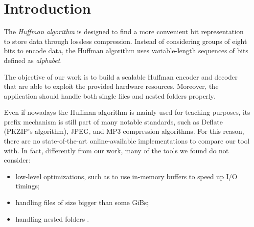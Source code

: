 \section{Introduction}
The \emph{Huffman algorithm} is designed to find a more convenient bit representation to store data through lossless compression. Instead of considering groups of eight bits to encode data, the Huffman algorithm uses variable-length sequences of bits defined as \emph{alphabet}.

The objective of our work is to build a scalable Huffman encoder and decoder that are able to exploit the provided hardware resources. Moreover, the application should handle both single files and nested folders properly.

Even if nowadays the Huffman algorithm is mainly used for teaching purposes, its prefix mechanism is still part of many notable standards, such as Deflate (PKZIP's algorithm), JPEG, and MP3 compression algorithms. For this reason, there are no state-of-the-art online-available implementations to compare our tool with. In fact, differently from our work, many of the tools we found do not consider:
\begin{itemize}
    \item low-level optimizations, such as to use in-memory buffers to speed up I/O timings\cite{HuffmanParallel,ParallelizedTextCompressio,HuffmanParallel2,Huffman,HuffmanCoding};
    \item handling files of size bigger than some GiBs\cite{HuffmanParallel,ParallelizedTextCompressio,ParallelHuffmanEncoding,HuffmanParallel2,HuffmanCoding,HuffmanCodingMPICUDA};
    \item handling nested folders \cite{HuffmanParallel,ParallelizedTextCompressio,ParallelHuffmanEncoding,HuffmanParallel2,Huffman,pdsAssignment4,HuffmanCoding,HuffmanCodingMPICUDA}.
\end{itemize}
